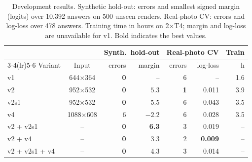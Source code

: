 \begin{table}[t]
\caption{Development results. Synthetic hold-out: errors and smallest signed margin (logits) over 10{,}392 answers on 500 unseen renders. Real-photo CV: errors and log-loss over 478 answers. Training time in hours on 2$\times$T4; margin and log-loss are unavailable for v1. Bold indicates the best values.}
\label{tab:dev}
\footnotesize
\setlength{\tabcolsep}{4pt}
\begin{tabular}{@{}lcrrrrr@{}}
\toprule
& & \multicolumn{2}{c}{Synth.\ hold-out} & \multicolumn{2}{c}{Real-photo CV} & Train \\
\cmidrule(lr){3-4}\cmidrule(lr){5-6}
Variant & Input & errors & margin & errors & log-loss & h \\
\midrule
v1 & 644$\times$364 & \textbf{0} & -- & 6 & -- & 1.6 \\
v2 & 952$\times$532 & \textbf{0} & $5.3$ & \textbf{1} & 0.011 & 3.9 \\
v2s1 & 952$\times$532 & \textbf{0} & $5.5$ & 6 & 0.043 & 3.5 \\
v4 & 1088$\times$608 & 6 & $-2.2$ & 6 & 0.028 & 3.5 \\
\midrule
v2 + v2s1 & -- & \textbf{0} & \textbf{6.3} & 3 & 0.019 & -- \\
v2 + v4 & -- & \textbf{0} & 3.3 & 2 & \textbf{0.009} & -- \\
v2 + v2s1 + v4 & -- & \textbf{0} & 4.3 & 3 & 0.014 & -- \\
\bottomrule
\end{tabular}
\end{table}
